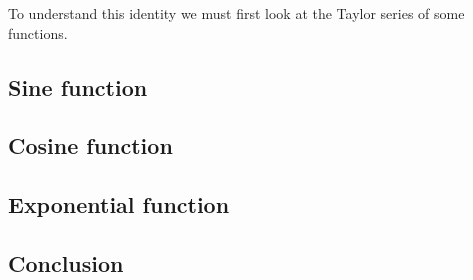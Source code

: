 \documentclass{article}
\begin{document}
To understand this identity we must first look at the Taylor series of some functions.

\subsection{Sine function}
\subsection{Cosine function}
\subsection{Exponential function}

\pagebreak

\subsection{Conclusion}
\end{document}
